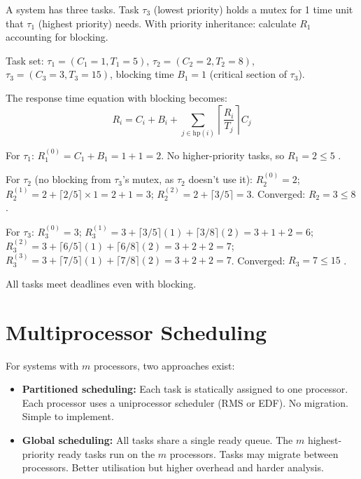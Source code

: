 \begin{example}
A system has three tasks. Task $\tau_3$ (lowest priority) holds a mutex for 1 time unit that $\tau_1$ (highest priority) needs. With priority inheritance: calculate $R_1$ accounting for blocking.

Task set: $\tau_1 = (C_1=1, T_1=5)$, $\tau_2 = (C_2=2, T_2=8)$, $\tau_3 = (C_3=3, T_3=15)$, blocking time $B_1 = 1$ (critical section of $\tau_3$).

\begin{solution}
The response time equation with blocking becomes:
\[
R_i = C_i + B_i + \sum_{j \in \mathrm{hp}(i)} \left\lceil \frac{R_i}{T_j} \right\rceil C_j
\]

For $\tau_1$: $R_1^{(0)} = C_1 + B_1 = 1 + 1 = 2$. No higher-priority tasks, so $R_1 = 2 \leq 5$ \checkmark.

For $\tau_2$ (no blocking from $\tau_3$'s mutex, as $\tau_2$ doesn't use it): $R_2^{(0)} = 2$; $R_2^{(1)} = 2 + \lceil 2/5\rceil \times 1 = 2 + 1 = 3$; $R_2^{(2)} = 2 + \lceil 3/5\rceil = 3$. Converged: $R_2 = 3 \leq 8$ \checkmark.

For $\tau_3$: $R_3^{(0)} = 3$; $R_3^{(1)} = 3 + \lceil 3/5\rceil(1) + \lceil 3/8\rceil(2) = 3 + 1 + 2 = 6$; $R_3^{(2)} = 3 + \lceil 6/5\rceil(1) + \lceil 6/8\rceil(2) = 3 + 2 + 2 = 7$; $R_3^{(3)} = 3 + \lceil 7/5\rceil(1) + \lceil 7/8\rceil(2) = 3 + 2 + 2 = 7$. Converged: $R_3 = 7 \leq 15$ \checkmark.

All tasks meet deadlines even with blocking.
\end{solution}
\end{example}

\section{Multiprocessor Scheduling}
\label{sec:sched:multi}

For systems with $m$ processors, two approaches exist:
\begin{itemize}
  \item \textbf{Partitioned scheduling:} Each task is statically assigned to one processor. Each processor uses a uniprocessor scheduler (RMS or EDF). No migration. Simple to implement.
  \item \textbf{Global scheduling:} All tasks share a single ready queue. The $m$ highest-priority ready tasks run on the $m$ processors. Tasks may migrate between processors. Better utilisation but higher overhead and harder analysis.
\end{itemize}

